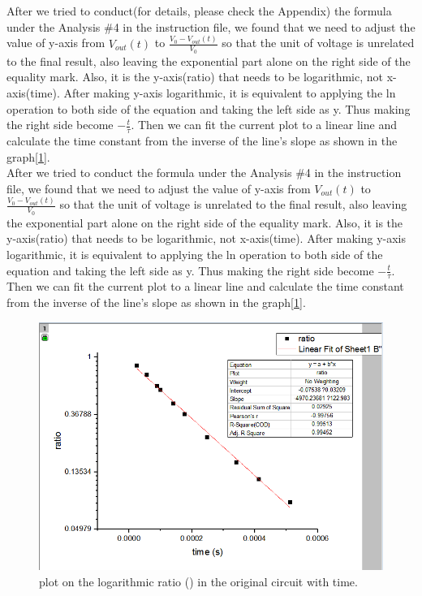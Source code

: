 After we tried to conduct(for details, please check the Appendix) the formula under the Analysis \#4 in the instruction file, we found that we need to adjust the value of y-axis from $V_{out}(t)$ to $\frac{V_0 - V_{out}(t)}{V_0}$ so that the unit of voltage is unrelated to the final result, also leaving the exponential part alone on the right side of the equality mark. Also, it is the y-axis(ratio) that needs to be logarithmic, not x-axis(time). After making y-axis logarithmic, it is equivalent to applying the ln operation to both side of the equation and taking the left side as y. Thus making the right side become $-\frac{t}{\tau}$. Then we can fit the current plot to a linear line and calculate the time constant from the inverse of the line's slope as shown in the graph[\ref{fig:2.2}].\\
\phantom{ }After we tried to conduct the formula under the Analysis \#4 in the instruction file, we found that we need to adjust the value of y-axis from $V_{out}(t)$ to $\frac{V_0 - V_{out}(t)}{V_0}$ so that the unit of voltage is unrelated to the final result, also leaving the exponential part alone on the right side of the equality mark. Also, it is the y-axis(ratio) that needs to be logarithmic, not x-axis(time). After making y-axis logarithmic, it is equivalent to applying the ln operation to both side of the equation and taking the left side as y. Thus making the right side become $-\frac{t}{\tau}$. Then we can fit the current plot to a linear line and calculate the time constant from the inverse of the line's slope as shown in the graph[\ref{fig:2.2}].\\
\begin{figure}[!htbp]
	\centering %
	\includegraphics[width=\linewidth]{images/2_2.PNG} %
	\caption{plot on the logarithmic ratio ({\tiny }) in the original circuit with time.} %
	\label{fig:2.2} %
\end{figure}
